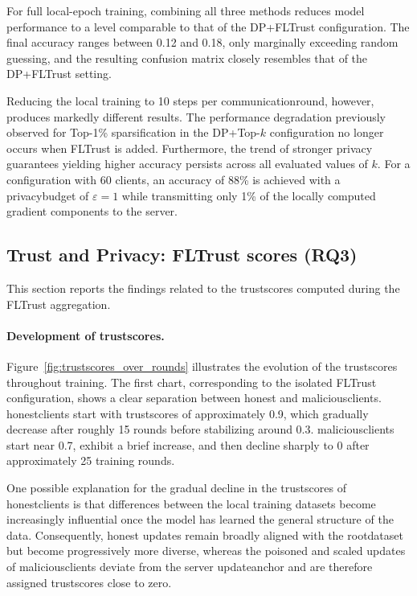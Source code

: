 \documentclass[11pt,twocolumn,a4paper,DIV=calc,parskip=half]{scrartcl}
\begin{document}
	For full local-epoch training, combining all three methods reduces model performance to a level comparable to that of the \ac{DP}+FLTrust configuration. The final accuracy ranges between 0.12 and 0.18, only marginally exceeding random guessing, and the resulting confusion matrix closely resembles that of the \ac{DP}+FLTrust setting.
	
	Reducing the local training to 10 steps per \gls{communicationround}, however, produces markedly different results. The performance degradation previously observed for Top-1\% sparsification in the \ac{DP}+Top-$k$ configuration no longer occurs when FLTrust is added. Furthermore, the trend of stronger privacy guarantees yielding higher accuracy persists across all evaluated values of $k$. For a configuration with 60 clients, an accuracy of 88\% is achieved with a \gls{privacybudget} of $\varepsilon = 1$ while transmitting only 1\% of the locally computed gradient components to the server.
	
	\subsection{Trust and Privacy: FLTrust scores (RQ3)}
	This section reports the findings related to the \glspl{trustscore} computed during the FLTrust aggregation.
	
	\paragraph{Development of \glspl{trustscore}.}
	Figure~\ref{fig:trustscores_over_rounds} illustrates the evolution of the \glspl{trustscore} throughout training. The first chart, corresponding to the isolated FLTrust configuration, shows a clear separation between honest and \glspl{maliciousclient}. \Glspl{honestclient} start with \glspl{trustscore} of approximately 0.9, which gradually decrease after roughly 15 rounds before stabilizing around 0.3. \Glspl{maliciousclient} start near 0.7, exhibit a brief increase, and then decline sharply to 0 after approximately 25 training rounds.
	
	One possible explanation for the gradual decline in the \glspl{trustscore} of \glspl{honestclient} is that differences between the local training datasets become increasingly influential once the model has learned the general structure of the data. Consequently, honest updates remain broadly aligned with the \gls{rootdataset} but become progressively more diverse, whereas the poisoned and scaled updates of \glspl{maliciousclient} deviate from the server \gls{updateanchor} and are therefore assigned \glspl{trustscore} close to zero.
	
\end{document}
